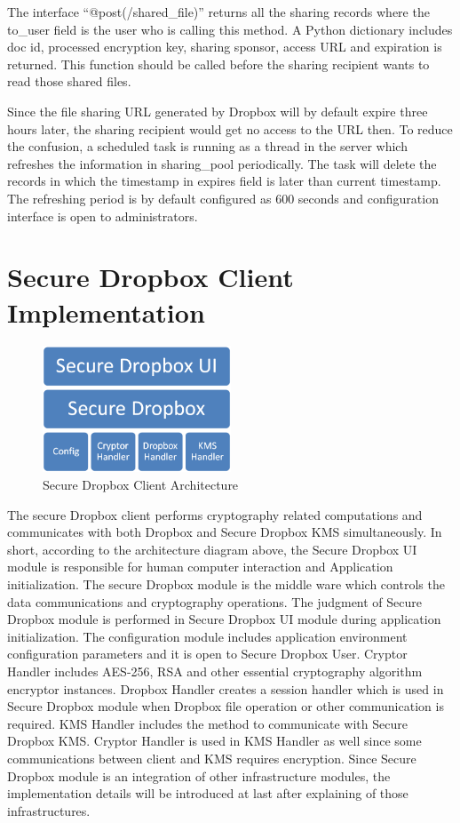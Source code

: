 The interface ``@post(/shared\_file)'' returns all the sharing records where the to\_user field is the user who is calling this method. A Python dictionary includes doc id, processed encryption key, sharing sponsor, access URL and expiration is returned. This function should be called before the sharing recipient wants to read those shared files.

Since the file sharing URL generated by Dropbox will by default expire three hours later, the sharing recipient would get no access to the URL then. To reduce the confusion, a scheduled task is running as a thread in the server which refreshes the information in sharing\_pool periodically. The task will delete the records in which the timestamp in expires field is later than current timestamp. The refreshing period is by default configured as 600 seconds and configuration interface is open to administrators.

\section{Secure Dropbox Client Implementation}

\begin{figure}[h]
        \centering
        \includegraphics[width=0.5\textwidth]{figures/Secure_Dropbox_Client_Architecture.png}
        \caption[Secure Dropbox Client Architecture] {Secure Dropbox Client Architecture}
\end{figure}

The secure Dropbox client performs cryptography related computations and communicates with both Dropbox and Secure Dropbox KMS simultaneously. In short, according to the architecture diagram above, the Secure Dropbox UI module is responsible for human computer interaction and Application initialization. The secure Dropbox module is the middle ware which controls the data communications and cryptography operations. The judgment of Secure Dropbox module is performed in Secure Dropbox UI module during application initialization. The configuration module includes application environment configuration parameters and it is open to Secure Dropbox User. Cryptor Handler includes AES-256, RSA and other essential cryptography algorithm encryptor instances. Dropbox Handler creates a session handler which is used in Secure Dropbox module when Dropbox file operation or other communication is required. KMS Handler includes the method to communicate with Secure Dropbox KMS. Cryptor Handler is used in KMS Handler as well since some communications between client and KMS requires encryption. Since Secure Dropbox module is an integration of other infrastructure modules, the implementation details will be introduced at last after explaining of those infrastructures.

